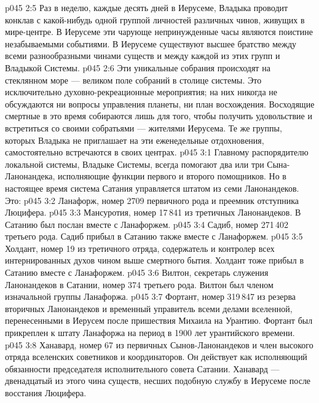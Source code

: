 \vs p045 2:5 Раз в неделю, каждые десять дней в Иерусеме, Владыка проводит конклав с какой\hyp{}нибудь одной группой личностей различных чинов, живущих в мире\hyp{}центре. В Иерусеме эти чарующе непринужденные часы являются поистине незабываемыми событиями. В Иерусеме существуют высшее братство между всеми разнообразными чинами существ и между каждой из этих групп и Владыкой Системы.
\vs p045 2:6 Эти уникальные собрания происходят на стеклянном море --- великом поле собраний в столице системы. Это исключительно духовно\hyp{}рекреационные мероприятия; на них никогда не обсуждаются ни вопросы управления планеты, ни план восхождения. Восходящие смертные в это время собираются лишь для того, чтобы получить удовольствие и встретиться со своими собратьями --- жителями Иерусема. Те же группы, которых Владыка не приглашает на эти еженедельные отдохновения, самостоятельно встречаются в своих центрах.
\vs p045 3:1 Главному распорядителю локальной системы, Владыке Системы, всегда помогают два или три Сына\hyp{}Ланонандека, исполняющие функции первого и второго помощников. Но в настоящее время система Сатания управляется штатом из семи Ланонандеков. Это:
\vs p045 3:2 \bibnobreakspace {} Ланафорж, номер 2709 первичного рода и преемник отступника Люцифера.
\vs p045 3:3 \pc {}\bibnobreakspace {} Мансуротия, номер 17\,841 из третичных Ланонандеков. В Сатанию был послан вместе с Ланафоржем.
\vs p045 3:4 \pc {}\bibnobreakspace {} Садиб, номер 271\,402 третьего рода. Садиб прибыл в Сатанию также вместе с Ланафоржем.
\vs p045 3:5 \pc {}\bibnobreakspace {} Холдант, номер 19 из третичного отряда, содержатель и контролер всех интернированных духов чином выше смертного бытия. Холдант тоже прибыл в Сатанию вместе с Ланафоржем.
\vs p045 3:6 \pc {}\bibnobreakspace {} Вилтон, секретарь служения Ланонандеков в Сатании, номер 374 третьего рода. Вилтон был членом изначальной группы Ланафоржа.
\vs p045 3:7 \pc {}\bibnobreakspace {} Фортант, номер 319\,847 из резерва вторичных Ланонандеков и временный управитель всеми делами вселенной, перенесенными в Иерусем после пришествия Михаила на Урантию. Фортант был прикреплен к штату Ланафоржа на период в 1900 лет урантийского времени.
\vs p045 3:8 \pc {}\bibnobreakspace {} Ханавард, номер 67 из первичных Сынов\hyp{}Ланонандеков и член высокого отряда вселенских советников и координаторов. Он действует как исполняющий обязанности председателя исполнительного совета Сатании. Ханавард --- двенадцатый из этого чина существ, несших подобную службу в Иерусеме после восстания Люцифера.
